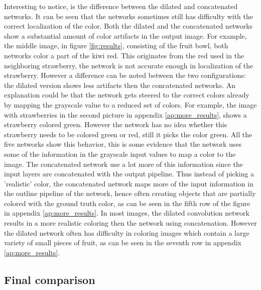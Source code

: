 Interesting to notice, is the difference between the dilated and concatenated networks. It can be seen that the networks sometimes still has difficulty with the correct localization of the color. Both the dilated and the concatenated networks show a substantial amount of color artifacts in the output image. For example, the middle image, in figure \ref{fig:results}, consisting of the fruit bowl, both networks color a part of the kiwi red. This originates from the red used in the neighboring strawberry, the network is not accurate enough in localization of the strawberry. However a difference can be noted between the two configurations: the dilated version shows less artifacts then the concatenated networks. An explanation could be that the network gets steered to the correct colors already by mapping the grayscale value to a reduced set of colors. For example, the image with strawberries in the second picture in appendix \ref{ap:more_results}, shows a strawberry colored green. However the network has no idea whether this strawberry needs to be colored green or red, still it picks the color green. All the five networks show this behavior, this is some evidence that the network uses some of the information in the grayscale input values to map a color to the image. The concatenated network use a lot more of this information since the input layers are concatenated with the output pipeline. Thus instead of picking a 'realistic' color, the concatenated network maps more of the input information in the outline pipeline of the network, hence often creating objects that are partially colored with the ground truth color, as can be seen in the fifth row of the figure in appendix \ref{ap:more_results}. In most images, the dilated convolution network results in a more realistic coloring then the network using concatenation. However the dilated network often has difficulty in coloring images which contain a large variety of small pieces of fruit, as can be seen in the seventh row in appendix \ref{ap:more_results}.

\subsection{Final comparison}








